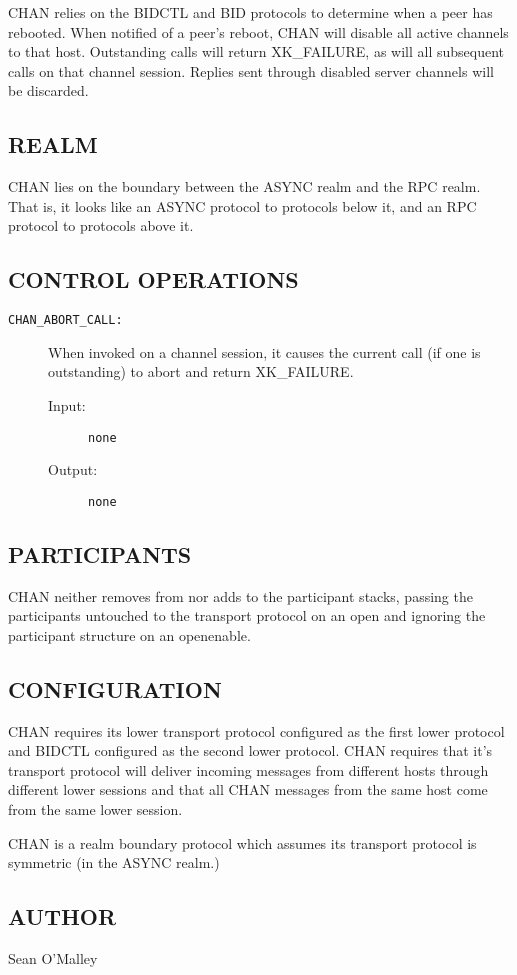 CHAN relies on the BIDCTL and BID protocols to determine when a peer
has rebooted.  When notified of a peer's reboot, CHAN will disable all
active channels to that host.  Outstanding calls will return
XK\_FAILURE, as will all subsequent calls on that channel session.
Replies sent through disabled server channels will be discarded.

\subsection*{REALM}

CHAN lies on the boundary between the ASYNC realm and the RPC realm.
That is, it looks like an ASYNC protocol to protocols below it, and
an RPC protocol to protocols above it.

\subsection*{CONTROL OPERATIONS}

\begin{description}

\item[{\tt CHAN\_ABORT\_CALL:}]
When invoked on a channel session, it causes the current call (if one
is outstanding) to abort and return XK\_FAILURE.
\begin{description}
\item[{\rm Input:}] {\tt none }
\item[{\rm Output:}] {\tt none }
\end{description}

\end{description}


\subsection*{PARTICIPANTS}

CHAN neither removes from nor adds to the participant stacks, passing
the participants untouched to the transport protocol on an open and
ignoring the participant structure on an openenable.

\subsection*{CONFIGURATION}

CHAN requires its lower transport protocol configured as the first
lower protocol and BIDCTL configured as the second lower protocol.
CHAN requires that it's transport protocol will deliver incoming messages
from different hosts through different lower sessions and that all
CHAN messages from the same host come from the same lower session.

CHAN is a realm boundary protocol which assumes its transport protocol is
symmetric (in the ASYNC realm.)

\subsection*{AUTHOR}

\noindent Sean O'Malley 
